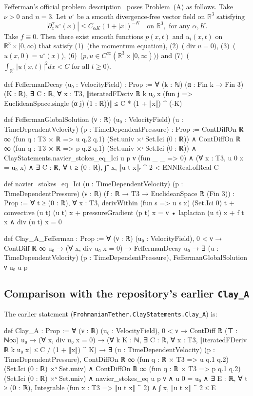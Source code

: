 \documentclass[11pt,a4paper]{article}
\theoremstyle{definition}
\theoremstyle{remark}
\newcommand{\R}{\mathbb{R}}
\newcommand{\lean}[1]{\texttt{#1}}
\begin{document}
Fefferman's official problem description~\cite{Fefferman} poses Problem~(A) as follows. Take $\nu>0$ and $n=3$. Let $u^\circ$ be a smooth divergence-free vector field on $\R^3$ satisfying
\[
|\partial_x^\alpha u^\circ(x)|\le C_{\alpha K}(1+|x|)^{-K}\quad\text{on }\R^3,\text{ for any }\alpha,K. \tag{4}
\]
Take $f\equiv0$. Then there exist smooth functions $p(x,t)$ and $u_i(x,t)$ on $\R^3\times[0,\infty)$ that satisfy (1)~(the momentum equation), (2)~($\operatorname{div}u=0$), (3)~($u(x,0)=u^\circ(x)$), (6)~($p,u\in C^\infty(\R^3\times[0,\infty))$) and (7)~($\int_{\R^3}|u(x,t)|^2dx<C$ for all $t\ge0$).

\begin{leancode}
def FeffermanDecay (u₀ : VelocityField) : Prop :=
  ∀ (k : ℕ) (α : Fin k → Fin 3) (K : ℝ), ∃ C : ℝ, ∀ x : T3,
    ‖iteratedFDeriv ℝ k u₀ x (fun j => EuclideanSpace.single (α j) (1 : ℝ))‖ ≤
      C * (1 + ‖x‖) ^ (-K)

def FeffermanGlobalSolution (ν : ℝ) (u₀ : VelocityField)
    (u : TimeDependentVelocity) (p : TimeDependentPressure) : Prop :=
  ContDiffOn ℝ ∞ (fun q : T3 × ℝ => u q.2 q.1) (Set.univ ×ˢ Set.Ici (0 : ℝ)) ∧
  ContDiffOn ℝ ∞ (fun q : T3 × ℝ => p q.2 q.1) (Set.univ ×ˢ Set.Ici (0 : ℝ)) ∧
  ClayStatements.navier_stokes_eq_Ici u p ν (fun _ _ => 0) ∧
  (∀ x : T3, u 0 x = u₀ x) ∧
  ∃ C : ℝ, ∀ t ≥ (0 : ℝ), ∫⁻ x, ‖u t x‖ₑ ^ 2 < ENNReal.ofReal C

def navier_stokes_eq_Ici (u : TimeDependentVelocity) (p : TimeDependentPressure)
    (ν : ℝ) (f : ℝ → T3 → EuclideanSpace ℝ (Fin 3)) : Prop :=
  ∀ t ≥ (0 : ℝ), ∀ x : T3,
    derivWithin (fun s => u s x) (Set.Ici 0) t + convective (u t) (u t) x +
        pressureGradient (p t) x = ν • laplacian (u t) x + f t x ∧
      div (u t) x = 0

def Clay_A_Fefferman : Prop :=
  ∀ (ν : ℝ) (u₀ : VelocityField),
    0 < ν → ContDiff ℝ ∞ u₀ → (∀ x, div u₀ x = 0) → FeffermanDecay u₀ →
      ∃ (u : TimeDependentVelocity) (p : TimeDependentPressure),
        FeffermanGlobalSolution ν u₀ u p
\end{leancode}

\subsection{Comparison with the repository's earlier \texttt{Clay\_A}}
The earlier statement (\lean{FrohmanianTether.ClayStatements.Clay\_A}) is:
\begin{leancode}
def Clay_A : Prop :=
  ∀ (ν : ℝ) (u₀ : VelocityField),
    0 < ν →
    ContDiff ℝ (⊤ : ℕ∞) u₀ →
    (∀ x, div u₀ x = 0) →
    (∀ k K : ℕ, ∃ C : ℝ, ∀ x : T3,
      ‖iteratedFDeriv ℝ k u₀ x‖ ≤ C / (1 + ‖x‖) ^ K) →
    ∃ (u : TimeDependentVelocity) (p : TimeDependentPressure),
      ContDiffOn ℝ ∞ (fun q : ℝ × T3 => u q.1 q.2) (Set.Ici (0 : ℝ) ×ˢ Set.univ) ∧
      ContDiffOn ℝ ∞ (fun q : ℝ × T3 => p q.1 q.2) (Set.Ici (0 : ℝ) ×ˢ Set.univ) ∧
      navier_stokes_eq u p ν ∧
      u 0 = u₀ ∧
      ∃ E : ℝ, ∀ t ≥ (0 : ℝ),
        Integrable (fun x : T3 => ‖u t x‖ ^ 2) ∧ ∫ x, ‖u t x‖ ^ 2 ≤ E
\end{leancode}
\end{document}

